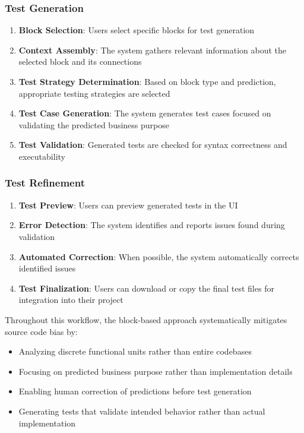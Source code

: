 \subsubsection{Test Generation}

\begin{enumerate}
    \item \textbf{Block Selection}: Users select specific blocks for test generation
    \item \textbf{Context Assembly}: The system gathers relevant information about the selected block and its connections
    \item \textbf{Test Strategy Determination}: Based on block type and prediction, appropriate testing strategies are selected
    \item \textbf{Test Case Generation}: The system generates test cases focused on validating the predicted business purpose
    \item \textbf{Test Validation}: Generated tests are checked for syntax correctness and executability
\end{enumerate}

\subsubsection{Test Refinement}

\begin{enumerate}
    \item \textbf{Test Preview}: Users can preview generated tests in the UI
    \item \textbf{Error Detection}: The system identifies and reports issues found during validation
    \item \textbf{Automated Correction}: When possible, the system automatically corrects identified issues
    \item \textbf{Test Finalization}: Users can download or copy the final test files for integration into their project
\end{enumerate}

\hspace{0.5cm}Throughout this workflow, the block-based approach systematically mitigates source code bias by:

\begin{itemize}
    \item Analyzing discrete functional units rather than entire codebases
    \item Focusing on predicted business purpose rather than implementation details
    \item Enabling human correction of predictions before test generation
    \item Generating tests that validate intended behavior rather than actual implementation
\end{itemize}

